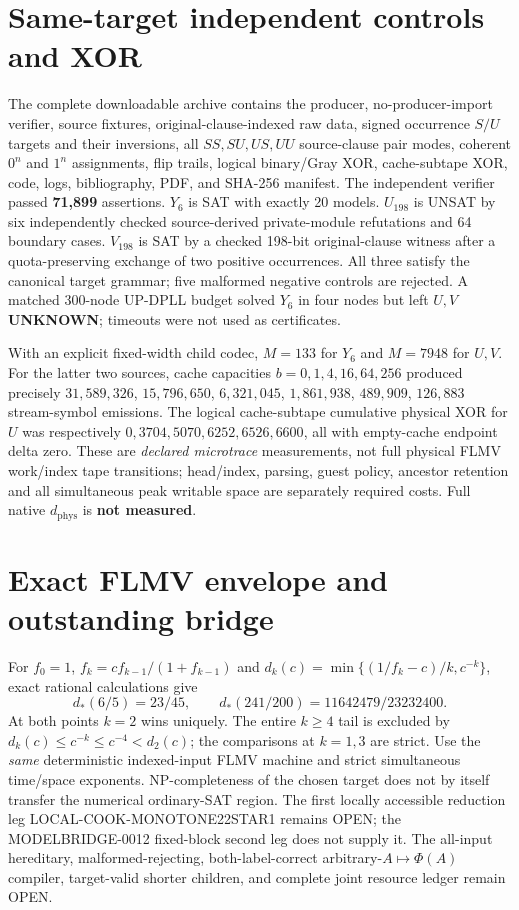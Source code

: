 \documentclass[10pt]{article}
\begin{document}
\section*{Same-target independent controls and XOR}
The complete downloadable archive contains the producer,
no-producer-import verifier, source fixtures, original-clause-indexed
raw data, signed occurrence $S/U$ targets and their inversions, all
$SS,SU,US,UU$ source-clause pair modes, coherent $0^n$ and $1^n$
assignments, flip trails, logical binary/Gray XOR, cache-subtape
XOR, code, logs, bibliography, PDF, and SHA-256 manifest.
The independent verifier passed \textbf{71,899} assertions.
$Y_6$ is SAT with exactly 20 models.
$U_{198}$ is UNSAT by six independently checked source-derived
private-module refutations and 64 boundary cases.
$V_{198}$ is SAT by a checked 198-bit original-clause witness
after a quota-preserving exchange of two positive occurrences.
All three satisfy the canonical target grammar; five malformed
negative controls are rejected. A matched 300-node UP-DPLL
budget solved $Y_6$ in four nodes but left $U,V$ \textbf{UNKNOWN};
timeouts were not used as certificates.

With an explicit fixed-width child codec, $M=133$ for $Y_6$ and
$M=7948$ for $U,V$. For the latter two sources, cache capacities
$b=0,1,4,16,64,256$ produced precisely
$31{,}589{,}326$, $15{,}796{,}650$, $6{,}321{,}045$,
$1{,}861{,}938$, $489{,}909$, $126{,}883$
stream-symbol emissions. The logical cache-subtape cumulative
physical XOR for $U$ was respectively
$0,3704,5070,6252,6526,6600$, all with empty-cache
endpoint delta zero. These are \emph{declared microtrace} measurements,
not full physical FLMV work/index tape transitions; head/index,
parsing, guest policy, ancestor retention and all simultaneous
peak writable space are separately required costs.
Full native $d_{\mathrm{phys}}$ is \textbf{not measured}.

\section*{Exact FLMV envelope and outstanding bridge}
For $f_0=1$, $f_k=cf_{k-1}/(1+f_{k-1})$ and
$d_k(c)=\min\{(1/f_k-c)/k,c^{-k}\}$, exact rational calculations give
\[
d_*(6/5)=23/45,\qquad
d_*(241/200)=11642479/23232400.
\]
At both points $k=2$ wins uniquely. The entire $k\ge4$ tail
is excluded by $d_k(c)\le c^{-k}\le c^{-4}<d_2(c)$;
the comparisons at $k=1,3$ are strict.
Use the \emph{same} deterministic indexed-input FLMV machine and
strict simultaneous time/space exponents.
NP-completeness of the chosen target does not by itself transfer
the numerical ordinary-SAT region. The first locally accessible
reduction leg LOCAL-COOK-MONOTONE22STAR1 remains OPEN; the
MODELBRIDGE-0012 fixed-block second leg does not supply it.
The all-input hereditary, malformed-rejecting,
both-label-correct arbitrary-$A\mapsto\Phi(A)$ compiler,
target-valid shorter children, and complete joint resource ledger
remain OPEN.
\end{document}
